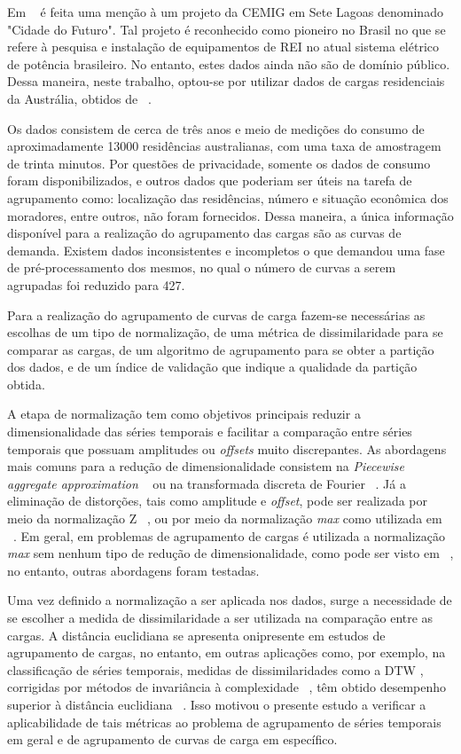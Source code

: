 Em ~\parencite{REI} é feita uma menção à um projeto da CEMIG em Sete Lagoas denominado "Cidade do Futuro". Tal projeto é reconhecido como pioneiro no Brasil no que se refere à pesquisa e instalação de equipamentos de REI no atual sistema elétrico de potência brasileiro. No entanto, estes dados ainda não são de domínio público. Dessa maneira, neste trabalho, optou-se por utilizar dados de cargas residenciais da Austrália, obtidos de ~\parencite{dadosAustralia}.

Os dados consistem de cerca de três anos e meio de medições do consumo de aproximadamente 13000 residências australianas, com uma taxa de amostragem de trinta minutos. Por questões de privacidade, somente os dados de consumo foram disponibilizados, e outros dados que poderiam ser úteis na tarefa de agrupamento como: localização das residências, número e situação econômica dos moradores, entre outros, não foram fornecidos. Dessa maneira, a única informação disponível para a realização do agrupamento das cargas são as curvas de demanda. Existem dados inconsistentes e incompletos o que demandou uma fase de pré-processamento dos mesmos, no qual o número de curvas a serem agrupadas foi reduzido para 427.

Para a realização do agrupamento de curvas de carga fazem-se necessárias as escolhas de um tipo de normalização, de uma métrica de dissimilaridade para se comparar as cargas, de um algoritmo de agrupamento para se obter a partição dos dados, e de um índice de validação que indique a qualidade da partição obtida. 

A etapa de normalização tem como objetivos principais reduzir a dimensionalidade das séries temporais e  facilitar a comparação entre séries temporais que possuam amplitudes ou \emph{offsets} muito discrepantes. As abordagens mais comuns para a redução de dimensionalidade consistem na \emph{Piecewise aggregate approximation} ~\parencite{SAX} ou na transformada discreta de Fourier ~\parencite{FFT}. Já a eliminação de distorções, tais como amplitude e \emph{offset}, pode ser realizada por meio da normalização Z ~\parencite{trillions}, ou por meio da normalização \emph{max} como utilizada em ~\parencite{Chicco}. Em geral, em problemas de agrupamento de cargas é utilizada a normalização \emph{max} sem nenhum tipo de redução de dimensionalidade, como pode ser visto em ~\parencite{Chicco, Flath2012,Tsekouras20081494}, no entanto, outras abordagens foram testadas.

Uma vez definido a normalização a ser aplicada nos dados, surge a necessidade de se escolher a medida de dissimilaridade a ser utilizada na comparação entre as cargas. A distância euclidiana se apresenta onipresente em estudos de agrupamento de cargas, no entanto, em outras aplicações como, por exemplo, na classificação de séries temporais, medidas de dissimilaridades como a DTW \parencite{DTW}, corrigidas por métodos de invariância à complexidade ~\parencite{CID}, têm obtido desempenho superior à distância euclidiana ~\parencite{BatistaComparativo}. Isso motivou o presente estudo a verificar a aplicabilidade de tais métricas ao problema de agrupamento de séries temporais em geral e de agrupamento de curvas de carga em específico.

